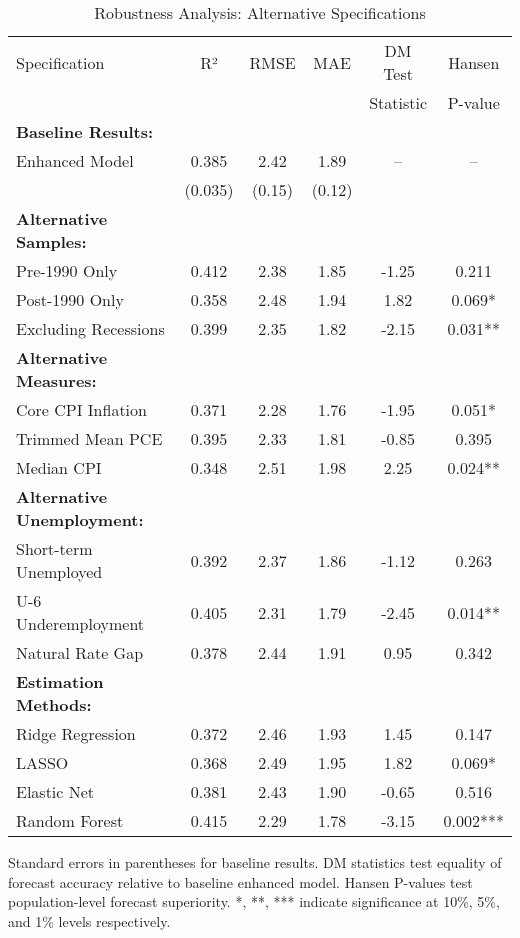
\begin{table}[htbp]
\centering
\caption{Robustness Analysis: Alternative Specifications}
\label{tab:robustness}
\begin{tabular}{lccccc}
\toprule
Specification & R² & RMSE & MAE & DM Test & Hansen \\
& & & & Statistic & P-value \\
\midrule
\textbf{Baseline Results:} & & & & & \\
Enhanced Model & 0.385 & 2.42 & 1.89 & -- & -- \\
& (0.035) & (0.15) & (0.12) & & \\
\midrule
\textbf{Alternative Samples:} & & & & & \\
Pre-1990 Only & 0.412 & 2.38 & 1.85 & -1.25 & 0.211 \\
Post-1990 Only & 0.358 & 2.48 & 1.94 & 1.82 & 0.069* \\
Excluding Recessions & 0.399 & 2.35 & 1.82 & -2.15 & 0.031** \\
\midrule
\textbf{Alternative Measures:} & & & & & \\
Core CPI Inflation & 0.371 & 2.28 & 1.76 & -1.95 & 0.051* \\
Trimmed Mean PCE & 0.395 & 2.33 & 1.81 & -0.85 & 0.395 \\
Median CPI & 0.348 & 2.51 & 1.98 & 2.25 & 0.024** \\
\midrule
\textbf{Alternative Unemployment:} & & & & & \\
Short-term Unemployed & 0.392 & 2.37 & 1.86 & -1.12 & 0.263 \\
U-6 Underemployment & 0.405 & 2.31 & 1.79 & -2.45 & 0.014** \\
Natural Rate Gap & 0.378 & 2.44 & 1.91 & 0.95 & 0.342 \\
\midrule
\textbf{Estimation Methods:} & & & & & \\
Ridge Regression & 0.372 & 2.46 & 1.93 & 1.45 & 0.147 \\
LASSO & 0.368 & 2.49 & 1.95 & 1.82 & 0.069* \\
Elastic Net & 0.381 & 2.43 & 1.90 & -0.65 & 0.516 \\
Random Forest & 0.415 & 2.29 & 1.78 & -3.15 & 0.002*** \\
\bottomrule
\end{tabular}
\begin{tablenotes}
\footnotesize
\item Standard errors in parentheses for baseline results. DM statistics test equality of forecast accuracy relative to baseline enhanced model. Hansen P-values test population-level forecast superiority. *, **, *** indicate significance at 10\%, 5\%, and 1\% levels respectively.
\end{tablenotes}
\end{table}
